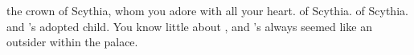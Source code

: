 \documentclass[char]{Kos}
\begin{document}
\begin{contacts}
\contact{\cBride{}} the crown \cBride{\prince} of Scythia, whom you adore with all your heart.
\contact{\cScythiaKing{}} \cScythiaKing{\Monarch} of Scythia.
\contact{\cScythiaQueen{}} \cScythiaQueen{\Monarch} of Scythia.
\contact{\cWard{}} \cScythiaKing{} and \cScythiaQueen{}'s adopted child. You know little about \cWard{\them}, and \cWard{\they}'s always seemed like an outsider within the palace.
\end{contacts} 
\end{document}
